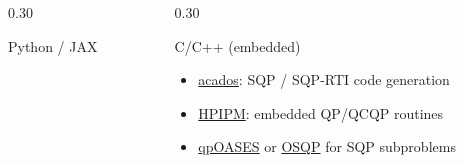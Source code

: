 \begin{frame}
\begin{columns}[T,totalwidth=0.98\textwidth]
\begin{column}{0.30\textwidth}
\begin{block}{Python / JAX}
\begin{minipage}[t][0.39\textheight][t]{\linewidth}
\begin{itemize}
                    \end{itemize}
                \end{minipage}
            \end{block}
        \end{column}\pause%
        \begin{column}{0.30\textwidth}
            \begin{block}{C/C++ (embedded)}
                \begin{minipage}[t][0.39\textheight][t]{\linewidth}
                    \begin{itemize}
                        \item \href{https://docs.acados.org/}{acados}: SQP / SQP-RTI code generation
                        \item \href{https://github.com/giaf/hpipm}{HPIPM}: embedded QP/QCQP routines
                        \item \href{https://coin-or.github.io/qpOASES/doc/3.0/doxygen/index.html}{qpOASES} or \href{https://osqp.org/docs/}{OSQP} for SQP subproblems
                    \end{itemize}
                \end{minipage}
            \end{block}
        \end{column}
    \end{columns}
\end{frame}

